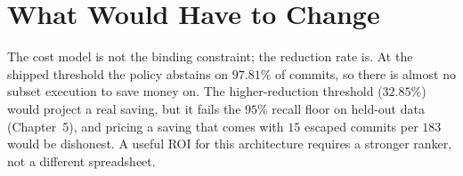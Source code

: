 \section{What Would Have to Change}
The cost model is not the binding constraint; the reduction rate is. At the shipped threshold the policy
abstains on $97.81\%$ of commits, so there is almost no subset execution to save money on. The
higher-reduction threshold ($32.85\%$) would project a real saving, but it fails the $95\%$ recall floor
on held-out data (Chapter~5), and pricing a saving that comes with $15$ escaped commits per $183$ would
be dishonest. A useful ROI for this architecture requires a stronger ranker, not a different
spreadsheet.
